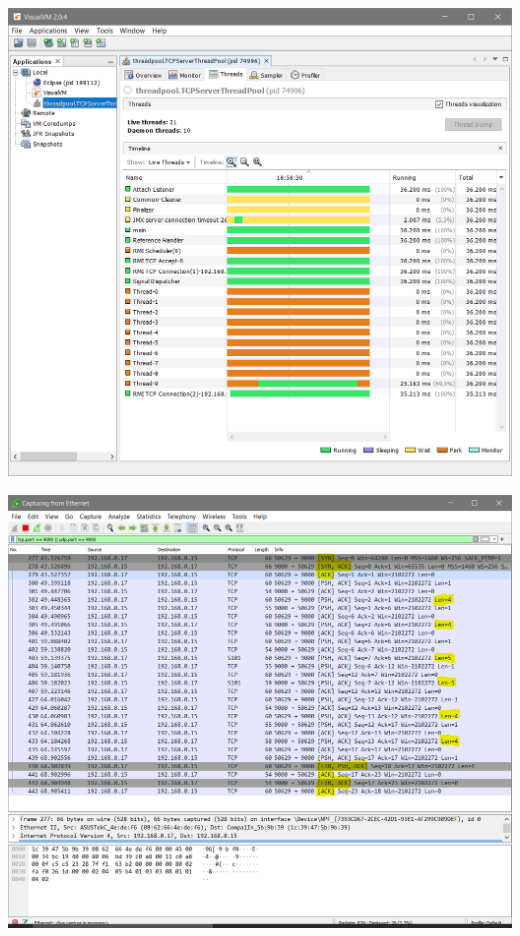 \vspace{2em}
\begin{minipage}{\textwidth}
    \hspace{-1em}
    \centering
    \includegraphics[scale=.4]{prints/visualvm-threadpool.PNG}
    \label{threadspng}
    \hspace{1em}
\end{minipage}
\vspace{0.5em}

\vspace{2em}
\begin{minipage}{\textwidth}
    \hspace{-1em}
    \centering
    \includegraphics[scale=.3]{prints/wireshark-threadpool.PNG}
    \label{threadspng}
    \hspace{1em}
\end{minipage}
\vspace{0.5em}